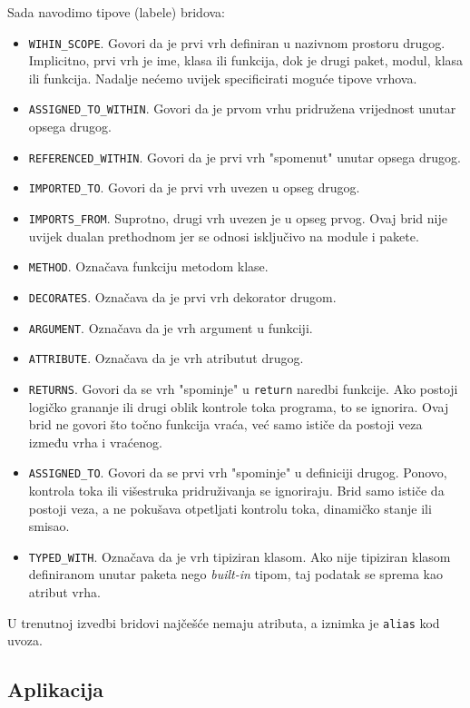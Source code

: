 Sada navodimo tipove (labele) bridova:
\begin{itemize}
\item \texttt{WIHIN_SCOPE}. Govori da je prvi vrh definiran u nazivnom prostoru drugog. Implicitno, prvi vrh je ime, klasa ili funkcija,
dok je drugi paket, modul, klasa ili funkcija. Nadalje nećemo uvijek specificirati moguće tipove vrhova.

\item \texttt{ASSIGNED_TO_WITHIN}. Govori da je prvom vrhu pridružena vrijednost unutar opsega drugog.
\item \texttt{REFERENCED_WITHIN}. Govori da je prvi vrh "spomenut" unutar opsega drugog.

\item \texttt{IMPORTED_TO}. Govori da je prvi vrh uvezen u opseg drugog.
\item \texttt{IMPORTS_FROM}. Suprotno, drugi vrh uvezen je u opseg prvog. Ovaj brid nije uvijek
dualan prethodnom jer se odnosi isključivo na module i pakete.

\item \texttt{METHOD}. Označava funkciju metodom klase.
\item \texttt{DECORATES}. Označava da je prvi vrh dekorator drugom.
\item \texttt{ARGUMENT}. Označava da je vrh argument u funkciji.

\item \texttt{ATTRIBUTE}. Označava da je vrh atributut drugog.

\item \texttt{RETURNS}. Govori da se vrh "spominje" u \texttt{return} naredbi funkcije. Ako postoji
logičko grananje ili drugi oblik kontrole toka programa, to se ignorira. Ovaj brid ne govori
što točno funkcija vraća, već samo ističe da postoji veza između vrha i vraćenog.
\item \texttt{ASSIGNED_TO}. Govori da se prvi vrh "spominje" u definiciji drugog. Ponovo,
kontrola toka ili višestruka pridruživanja se ignoriraju. Brid samo ističe da postoji veza,
a ne pokušava otpetljati kontrolu toka, dinamičko stanje ili smisao.

\item \texttt{TYPED_WITH}. Označava da je vrh tipiziran klasom. Ako nije tipiziran klasom
definiranom unutar paketa nego \emph{built-in} tipom, taj podatak se sprema kao atribut vrha.

\end{itemize}

U trenutnoj izvedbi bridovi najčešće nemaju atributa, a iznimka je \texttt{alias} kod uvoza.

\newpage
\subsection{Aplikacija}
